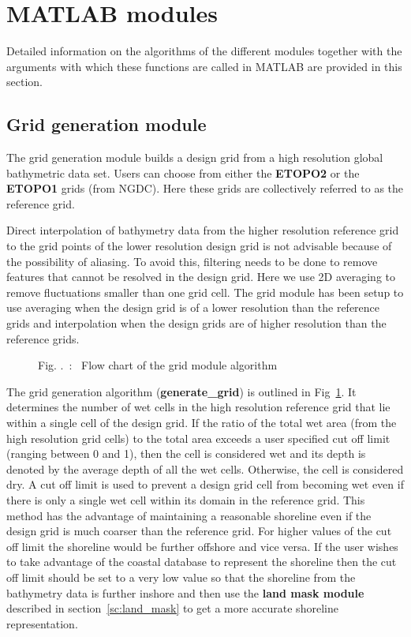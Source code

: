 \documentclass[12pt]{article}
\newcommand{\newsec}{\setcounter{equation}{0}
                     \setcounter{myfigno}{0}
                     \setcounter{mytabno}{0}}
\newcounter{myfigno}[section]
\newenvironment{myfig}[1]{\begin{figure}[#1]
                        \refstepcounter{myfigno}}
                       {\end{figure}}
\newcommand{\myfcapc}[1]{\begin{center} \ff Fig. \themyfigno\ :~ #1
                        \end{center}}
\newcounter{mytabno}[section]
\renewcommand{\themyfigno}{\thesection.\arabic{myfigno}}
\begin{document}
\section{MATLAB modules}
\newsec

Detailed information on the algorithms of the different modules together with the arguments with which these functions are called in MATLAB are provided in this section.

\subsection{Grid generation module} \label{sc:grid}

The grid generation module builds a design grid from a high resolution global bathymetric data set. Users can choose from either the {\bf ETOPO2} or the {\bf ETOPO1} grids (from NGDC). Here these grids are collectively referred to as the reference grid.

Direct interpolation of bathymetry data from the higher resolution reference grid to the grid points of the lower resolution design grid is not advisable because of the possibility of aliasing. To avoid this, filtering needs to be done to remove features that cannot be resolved in the design grid. Here we use 2D averaging to remove fluctuations smaller than one grid cell. The grid module has been setup to use averaging when the design grid is of a lower resolution than the reference grids and interpolation when the design grids are of higher resolution than the reference grids. 

\begin{myfig}{tbp}
\centerline{}
\myfcapc{Flow chart of the grid module algorithm}
\label{fig:grid_module}
\end{myfig}

The grid generation algorithm  ({\bf generate\_grid}) is outlined in Fig~\ref{fig:grid_module}. It determines the number of wet cells in the high resolution reference grid that lie within a single cell of the design grid. If the ratio of the total wet area (from the high resolution grid cells) to the total area exceeds a user specified cut off limit (ranging between 0 and 1), then the cell is considered wet and its depth is denoted by the average depth of all the wet cells. Otherwise, the cell is considered dry. A cut off limit is used to prevent a design grid cell from becoming wet even if there is only a single wet cell within its domain in the reference grid. This method has the advantage of maintaining a reasonable shoreline even if the design grid is much coarser than the reference grid. For higher values of the cut off limit the shoreline would be further offshore and vice versa. If the user wishes to take advantage of the coastal database to represent the shoreline then the cut off limit should be set to a very low value so that the shoreline from the bathymetry data is further inshore and then use the {\bf land mask module} described in section~\ref{sc:land_mask} to get a more accurate shoreline representation. 
\end{document}
